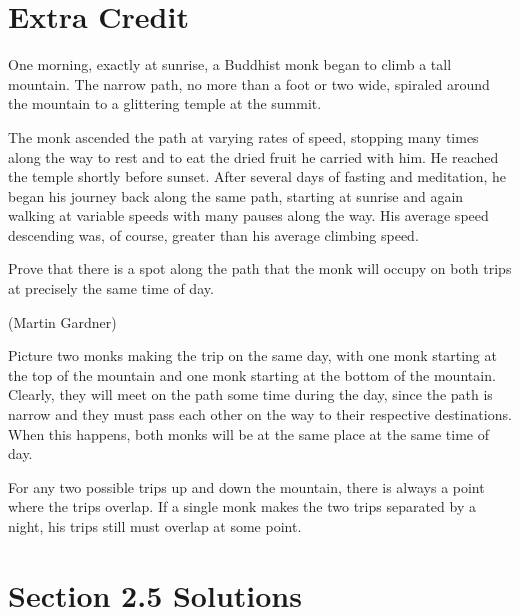 \documentclass[letterpaper, landscape]{exam}
\begin{document}
  \ifprintanswers{}
  \else
    \newpage
  \fi

  \section{Extra Credit} %

  One morning, exactly at sunrise, a Buddhist monk began to climb a tall mountain.  The narrow path, no more than a
  foot or two wide, spiraled around the mountain to a glittering temple at the summit.

  The monk ascended the path at varying rates of speed, stopping many times along the way to rest and to eat the dried
  fruit he carried with him.  He reached the temple shortly before sunset.  After several days of fasting and
  meditation, he began his journey back along the same path, starting at sunrise and again walking at variable speeds
  with many pauses along the way.  His average speed descending was, of course, greater than his average climbing
  speed.

  Prove that there is a spot along the path that the monk will occupy on both trips at precisely the same time of day.

  (Martin Gardner)

  \begin{solution}
    Picture two monks making the trip on the same day, with one monk starting at the top of the mountain and one monk
    starting at the bottom of the mountain.  Clearly, they will meet on the path some time during the day, since the
    path is narrow and they must pass each other on the way to their respective destinations.  When this happens, both
    monks will be at the same place at the same time of day.  

    For any two possible trips up and down the mountain, there is always a point where the trips overlap.  If a
    single monk makes the two trips separated by a night, his trips still must overlap at some point.

  \end{solution}

  \ifprintanswers{}

    \section{Section 2.5 Solutions} 
\end{document}

